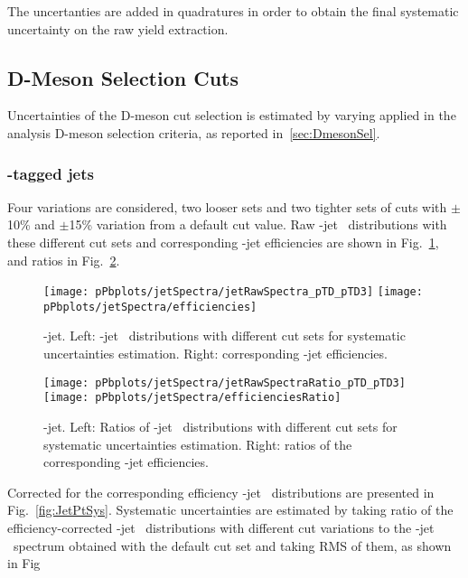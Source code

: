 The uncertanties are added in quadratures in order to obtain the final systematic uncertainty on the raw yield extraction. 

\subsection{D-Meson Selection Cuts}
Uncertainties of the D-meson cut selection is estimated by varying applied in the analysis D-meson selection criteria, as reported in~\ref{sec:DmesonSel}. 

\subsubsection{\Dstar-tagged jets}

Four variations are considered, two looser sets and two tighter sets of cuts with $\pm$10\% and $\pm$15\% variation from a default cut value. Raw \Dstar-jet \pt\ distributions with these different cut sets and corresponding \Dstar-jet efficiencies are shown in Fig.~\ref{fig:JetPtRawSys}, and ratios in Fig.~\ref{fig:JetPtRawSysRatio}.

\begin{figure}[bth]
\begin{center}
\texttt{[image: pPbplots/jetSpectra/jetRawSpectra\_pTD\_pTD3]}
\texttt{[image: pPbplots/jetSpectra/efficiencies]}
\caption{\Dstar-jet. Left: \Dstar-jet \pt\ distributions with different cut sets for systematic uncertainties estimation. Right: corresponding \Dstar-jet efficiencies.} 
\label{fig:JetPtRawSys}
\end{center}
\end{figure}

\begin{figure}[bth]
\begin{center}
\texttt{[image: pPbplots/jetSpectra/jetRawSpectraRatio\_pTD\_pTD3]}
\texttt{[image: pPbplots/jetSpectra/efficienciesRatio]}
\caption{\Dstar-jet. Left: Ratios of \Dstar-jet \pt\ distributions with different cut sets for systematic uncertainties estimation. Right: ratios of the corresponding \Dstar-jet efficiencies.} 
\label{fig:JetPtRawSysRatio}
\end{center}
\end{figure}

Corrected for the corresponding efficiency \Dstar-jet \pt\ distributions are presented in Fig.~\ref{fig:JetPtSys}. Systematic uncertainties are estimated by taking ratio of the efficiency-corrected \Dstar-jet \pt\ distributions with different cut variations to the \Dstar-jet \pt\ spectrum obtained with the default cut set and taking RMS of them, as shown in Fig


